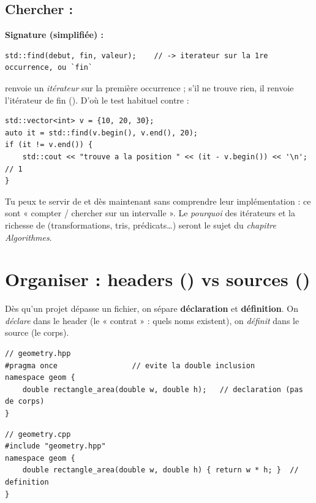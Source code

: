 \documentclass[11pt]{article}
\begin{document}
\subsection*{Chercher : }

\textbf{Signature (simplifiée) :}
\begin{lstlisting}
std::find(debut, fin, valeur);    // -> iterateur sur la 1re occurrence, ou `fin`
\end{lstlisting}

 renvoie un \emph{itérateur} sur la première occurrence ; s'il
ne trouve rien, il renvoie l'itérateur de fin (). D'où le test
habituel contre  :

\begin{lstlisting}
std::vector<int> v = {10, 20, 30};
auto it = std::find(v.begin(), v.end(), 20);
if (it != v.end()) {
    std::cout << "trouve a la position " << (it - v.begin()) << '\n';  // 1
}
\end{lstlisting}

\begin{aretenir}
Tu peux te servir de  et  dès maintenant sans
comprendre leur implémentation : ce sont « compter / chercher sur un
intervalle ». Le \emph{pourquoi} des itérateurs et la richesse de
 (transformations, tris, prédicats\ldots) seront le sujet du
\emph{chapitre Algorithmes}.
\end{aretenir}

\section{Organiser : headers () vs sources ()}

Dès qu'un projet dépasse un fichier, on sépare \textbf{déclaration} et
\textbf{définition}. On \emph{déclare} dans le header (le « contrat » : quels
noms existent), on \emph{définit} dans le source (le corps).

\begin{lstlisting}
// geometry.hpp
#pragma once                 // evite la double inclusion
namespace geom {
    double rectangle_area(double w, double h);   // declaration (pas de corps)
}
\end{lstlisting}
\begin{lstlisting}
// geometry.cpp
#include "geometry.hpp"
namespace geom {
    double rectangle_area(double w, double h) { return w * h; }  // definition
}
\end{lstlisting}
\end{document}
